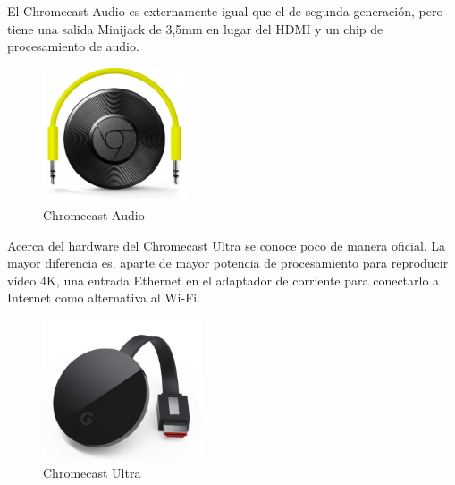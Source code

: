 El Chromecast Audio es externamente igual que el de segunda generación, pero tiene una salida Minijack de 3,5mm en lugar del HDMI y un chip de procesamiento de audio.

\begin{figure}[h]
	\centering
	\includegraphics[width=0.38\textwidth]{./Imagenes/chromecastaudio.png}
	\caption{Chromecast Audio}\label{fig:audio}
\end{figure}

Acerca del hardware del Chromecast Ultra se conoce poco de manera oficial.
La mayor diferencia es, aparte de mayor potencia de procesamiento para reproducir vídeo 4K, una entrada Ethernet en el adaptador de corriente para conectarlo a Internet como alternativa al Wi-Fi.

\begin{figure}[h]
	\centering
	\includegraphics[width=0.42\textwidth]{./Imagenes/chromecast-ultra.jpg}
	\caption{Chromecast Ultra}\label{fig:ultra}
\end{figure}
